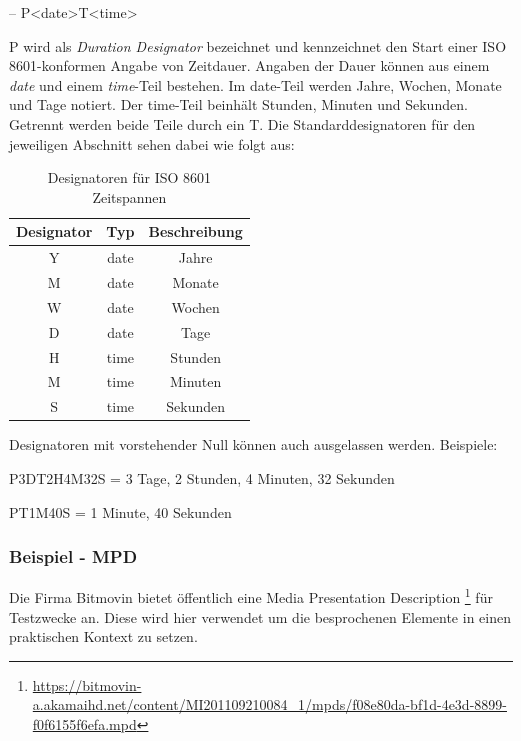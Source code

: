 \documentclass[paper = a4, fontsize = 12pt, parskip = half]{scrartcl} %
\begin{document}
-- P<date>T<time>

P wird als \textit{Duration Designator} bezeichnet und kennzeichnet den Start einer ISO 8601-konformen Angabe von Zeitdauer. Angaben der Dauer können aus einem \textit{date} und einem \textit{time}-Teil bestehen. Im date-Teil werden Jahre, Wochen, Monate und Tage notiert. Der time-Teil beinhält Stunden, Minuten und Sekunden. Getrennt werden beide Teile durch ein T. Die Standarddesignatoren für den jeweiligen Abschnitt sehen dabei wie folgt aus:

\begin{center}
    \begin{table}[ht]
        \label{iso_duration_designators}
        \centering
        \begin{tabular}{|c|c|c|}
            \hline
                \textbf{Designator} & \textbf{Typ} & \textbf{Beschreibung} \\
            \hline
            \hline
            Y & date & Jahre \\
            \hline
            M & date & Monate \\
            \hline
            W & date & Wochen \\
            \hline
            D & date & Tage \\
            \hline
            \hline
            H & time & Stunden \\
            \hline
            M & time & Minuten \\
            \hline
            S & time & Sekunden \\
            \hline
        \end{tabular}
        \caption{Designatoren für ISO 8601 Zeitspannen}
    \end{table}
\end{center}
Designatoren mit vorstehender Null können auch ausgelassen werden. Beispiele:

P3DT2H4M32S = 3 Tage, 2 Stunden, 4 Minuten, 32 Sekunden

PT1M40S = 1 Minute, 40 Sekunden

\subsubsection{Beispiel - MPD}
 Die Firma Bitmovin bietet öffentlich eine Media Presentation Description \footnote{\url{https://bitmovin-a.akamaihd.net/content/MI201109210084_1/mpds/f08e80da-bf1d-4e3d-8899-f0f6155f6efa.mpd}} für Testzwecke an. Diese wird hier verwendet um die besprochenen Elemente in einen praktischen Kontext zu setzen.
\end{document}
